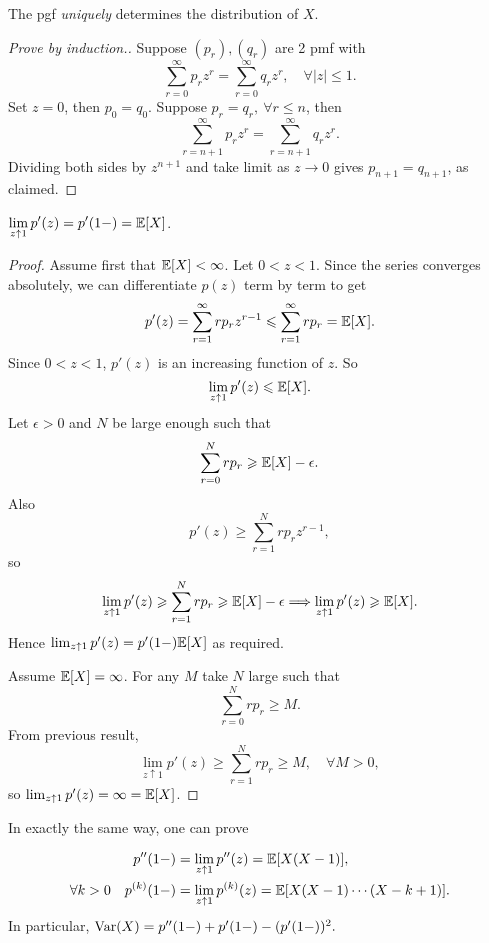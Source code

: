 \begin{theorem}
    The pgf \textit{uniquely} determines the distribution of $X$.
\end{theorem}
\begin{proof}[Prove by induction.]
    Suppose $(p_r),(q_r)$ are 2 pmf with 
    \[
        \sum_{r=0}^{\infty} p_r z^r = \sum_{r=0}^{\infty}q_rz^r,\quad \forall |z|\le 1.
    \]
    Set $z=0$, then $ p_0=q_0 $. Suppose $ p_r=q_r,\ \forall r\le n $, then 
    \[
        \sum_{r=n+1}^{\infty}p_rz^r = \sum_{r=n+1}^{\infty} q_rz^r.
    \]
    Dividing both sides by $ z^{n+1} $ and take limit as $ z\to 0  $ gives $ p_{n+1}=q_{n+1} $, as claimed.
\end{proof}

\begin{theorem}
    $\displaystyle \lim_{z \uparrow 1} p'(z)=p'(1-)={\mathbb{E}}[X]$. 
\end{theorem}
\begin{proof}
    Assume first that $ {\mathbb{E}}[X]< \infty $. Let $ 0<z<1 $. Since the series converges absolutely, we can differentiate $ p(z) $ term by term to get 
    \[
        p'(z) = \sum_{r=1}^{\infty} r p_r z^{r-1}\leqslant \sum_{r=1}^{\infty}rp_r = {\mathbb{E}}[X].
    \]
    Since $ 0<z<1 $, $ p'(z) $ is an increasing function of $z$. So 
    \[
        \lim_{z \uparrow 1} p'(z)\leqslant {\mathbb{E}}[X].
    \]
    Let $ \epsilon>0 $ and $N$ be large enough such that 
    \[
        \sum_{r=0}^{N}rp_r\geqslant {\mathbb{E}}[X]-\epsilon.
    \]
    Also 
    \[
        p'(z)\ge \sum_{r=1}^{N}rp_rz^{r-1},
    \]
    so 
    \[
        \lim_{z \uparrow 1} p'(z) \geqslant \sum_{r=1}^{N}rp_r\geqslant {\mathbb{E}}[X]-\epsilon \Longrightarrow \lim_{z \uparrow 1} p'(z) \geqslant {\mathbb{E}}[X].
    \]
    Hence $\lim_{z \uparrow 1} p'(z)=p'(1-){\mathbb{E}}[X]$ as required.

    Assume $ {\mathbb{E}}[X]=\infty $. For any $M$ take $N$ large such that 
    \[
        \sum_{r=0}^{N}rp_r\ge M.
    \]
    From previous result,
    \[
        \lim_{z \uparrow 1} p'(z)\ge \sum_{r=1}^{N}rp_r\ge M,\quad \forall M>0,
    \]
    so $ \lim_{z \uparrow 1} p'(z)=\infty ={\mathbb{E}}[X]$.
\end{proof}
In exactly the same way, one can prove 
\begin{theorem}
    \begin{align*}
        p''&(1-)=\lim_{z \uparrow 1}p''(z)={\mathbb{E}}[X(X-1)],\\
        \forall k>0\quad  p^{(k)}&(1-)=\lim_{z \uparrow 1}p^{(k)}(z) = {\mathbb{E}}[X(X-1)\cdots(X-k+1)].
    \end{align*}
    In particular, $ \operatorname{Var}(X)=p''(1-)+p'(1-)-(p'(1-))^2. $ 
\end{theorem}

